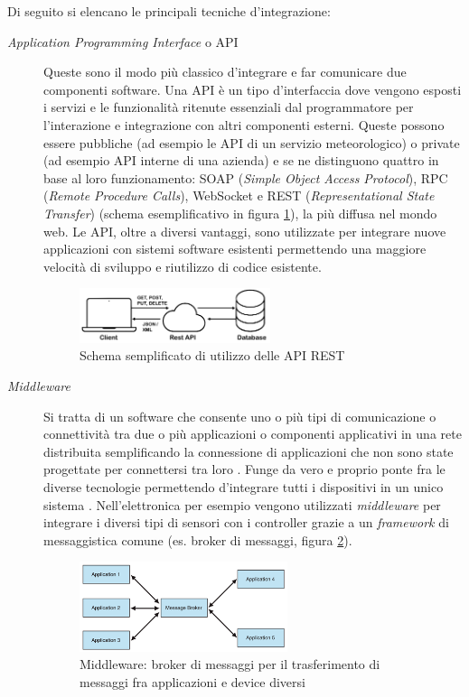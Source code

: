 Di seguito si elencano le principali tecniche d'integrazione:

\begin{description}
    \item [\textit{Application Programming Interface} o API] {Queste sono il modo più classico d'integrare e far comunicare due componenti software. Una API è un tipo d'interfaccia dove vengono esposti i servizi e le funzionalità ritenute essenziali dal programmatore per l'interazione e integrazione con altri componenti esterni.
    Queste possono essere pubbliche (ad esempio le API di un servizio meteorologico) o private (ad esempio API interne di una azienda) e se ne distinguono quattro in base al loro funzionamento: SOAP (\textit{Simple Object Access Protocol}), RPC (\textit{Remote Procedure Calls}), WebSocket e REST (\textit{Representational State Transfer}) (schema esemplificativo in figura \ref{fig:restAPIschema}), la più diffusa nel mondo web.
    Le API, oltre a diversi vantaggi, sono utilizzate per integrare nuove applicazioni con sistemi software esistenti permettendo una maggiore velocità di sviluppo e riutilizzo di codice esistente.}

    \begin{figure} 
        \centering
        \includegraphics[width=0.55\textwidth]{img/api-firebase.png}
        \caption{Schema semplificato di utilizzo delle API REST}
        \label{fig:restAPIschema}
    \end{figure}
    
    \item [\textit{Middleware}] Si tratta di un software che consente uno o più tipi di comunicazione o connettività tra due o più applicazioni o componenti applicativi in una rete distribuita semplificando la connessione di applicazioni che non sono state progettate per connettersi tra loro \cite[IBM]{ibm_middleware}. Funge da vero e proprio ponte fra le diverse tecnologie permettendo d'integrare tutti i dispositivi in un unico sistema \cite{aws}. Nell'elettronica per esempio vengono utilizzati \textit{middleware} per integrare i diversi tipi di sensori con i controller grazie a un \textit{framework} di messaggistica comune (es. broker di messaggi, figura \ref{fig:broker}).
 
    \begin{figure} 
        \centering
        \includegraphics[width=0.6\textwidth]{img/message-broker.png}
        \caption{Middleware: broker di messaggi per il trasferimento di messaggi fra applicazioni e device diversi}
        \label{fig:broker}
    \end{figure}


\end{description}
